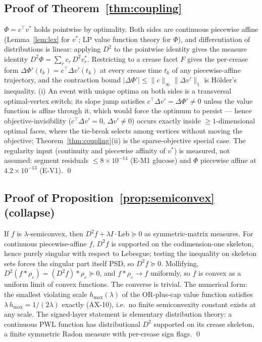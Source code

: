 \documentclass[11pt,a4paper]{article}
\theoremstyle{plain}
\theoremstyle{definition}
\theoremstyle{remark}
\begin{document}
\subsection{Proof of Theorem~\ref{thm:coupling}}

$\Phi = c^\top v^*$ holds pointwise by optimality. Both sides are
continuous piecewise affine (Lemma~\ref{lem:lex} for $v^*$; LP value
function theory for $\Phi$), and differentiation of distributions is
linear: applying $D^2$ to the pointwise identity gives the measure
identity $D^2\Phi = \sum_r c_r\, D^2 v^*_r$. Restricting to a crease
facet $F$ gives the per-crease form $\Delta\Phi'(t_k) = c^\top
\Delta v'(t_k)$ at every crease time $t_k$ of any piecewise-affine
trajectory, and the contraction bound $|\Delta\Phi'| \le
\|c\|_\infty \|\Delta v'\|_1$ is H\"older's inequality. (i) An event
with unique optima on both sides is a transversal optimal-vertex
switch; its slope jump satisfies $c^\top \Delta v' = \Delta\Phi'
\neq 0$ unless the value function is affine through it, which
would force the optimum to persist --- hence
objective-invisibility ($c^\top \Delta v' = 0$, $\Delta v' \ne 0$)
occurs exactly inside $\ge 1$-dimensional optimal faces, where the
tie-break selects among vertices without moving the objective;
Theorem~\ref{thm:coupling}(ii) is the sparse-objective special
case. The regularity input (continuity and piecewise affinity of
$v^*$) is measured, not assumed: segment residuals $\le 8 \times
10^{-14}$ (E-M1 glucose) and $\Phi$ piecewise affine at $4.2 \times
10^{-13}$ (E-V1). \qed

\subsection{Proof of Proposition~\ref{prop:semiconvex} (collapse)}

If $f$ is $\lambda$-semiconvex, then $D^2 f + \lambda I \cdot
\mathrm{Leb} \succeq 0$ as symmetric-matrix measures. For continuous
piecewise-affine $f$, $D^2 f$ is supported on the codimension-one
skeleton, hence purely singular with respect to Lebesgue; testing
the inequality on skeleton sets forces the singular part itself
PSD, so $D^2 f \succeq 0$. Mollifying, $D^2(f * \rho_\varepsilon)
= (D^2 f) * \rho_\varepsilon \succeq 0$, and $f * \rho_\varepsilon
\to f$ uniformly, so $f$ is convex as a uniform limit of convex
functions. The converse is trivial. The numerical form: the
smallest violating scale $h_{\max}(\lambda)$ of the OR-plus-cap
value function satisfies $\lambda\,h_{\max} = 1/(2\lambda)$
exactly (AX-10), i.e.\ no finite semiconvexity constant exists at
any scale. The signed-layer statement is elementary distribution
theory: a continuous PWL function has distributional $D^2$
supported on its crease skeleton, a finite symmetric Radon measure
with per-crease sign flags. \qed
\end{document}
